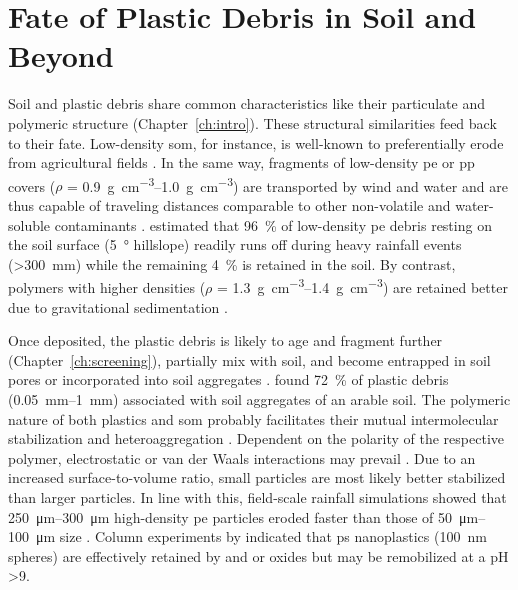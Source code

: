 \section{Fate of Plastic Debris in Soil and Beyond}
\label{sec:general-discussion:fate}

Soil and plastic debris share common characteristics like their particulate and polymeric structure (Chapter~\ref{ch:intro}). These structural similarities feed back to their fate.
Low-density \ac{som}, for instance, is well-known to preferentially erode from agricultural fields \citep{LalSoil2005,RumpelPreferential2006}. In the same way, fragments of low-density \ac{pe} or \ac{pp} covers ($\rho$ = \SIrange{0.9}{1.0}{\gram\per\cubic\centi\meter}) are transported by wind \citep{RezaeiWind2019,BullardPreferential2021} and water \citep{LaermannsTracing2021,RehmSoil2021} and are thus capable of traveling distances comparable to other non-volatile and water-soluble contaminants \citep{StubbinsPlastics2021}.  estimated that \SI{96}{\percent} of low-density \ac{pe} debris resting on the soil surface (\SI{5}{\degree} hillslope) readily runs off during heavy rainfall events (\SI{>300}{\milli\meter}) while the remaining \SI{4}{\percent} is retained in the soil. By contrast, polymers with higher densities ($\rho$ = \SIrange{1.3}{1.4}{\gram\per\cubic\centi\meter}) are retained better due to gravitational sedimentation \citep{DongTransport2021,O'ConnorMicroplastics2019}.

Once deposited, the plastic debris is likely to age and fragment further (Chapter~\ref{ch:screening}), partially mix with soil, and become entrapped in soil pores or incorporated into soil aggregates \citep{RilligMicroplastic2017}.  found \SI{72}{\percent} of plastic debris (\SIrange{0.05}{1}{\milli\meter}) associated with soil aggregates of an arable soil. The polymeric nature of both plastics and \ac{som} probably facilitates their mutual intermolecular stabilization and heteroaggregation \citep{SchaumannSoil2006,LuoDistribution2020}. Dependent on the polarity of the respective polymer, electrostatic or van der Waals interactions may prevail \citep{LuoDistribution2020}. Due to an increased surface-to-volume ratio, small particles are most likely better stabilized than larger particles. In line with this, field-scale rainfall simulations showed that \SIrange{250}{300}{\micro\meter} high-density \ac{pe} particles eroded faster than those of \SIrange{50}{100}{\micro\meter} size \citep{RehmSoil2021}. Column experiments by \citet{WuTransport2020} indicated that \ac{ps} nanoplastics (\SI{100}{\nano\meter} spheres) are effectively retained by  and  or  oxides but may be remobilized at a pH \num{>9}.

